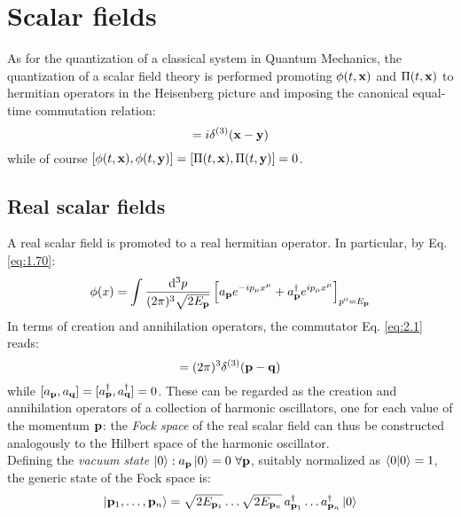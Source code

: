 
\section{Scalar fields}

As for the quantization of a classical system in Quantum Mechanics, the quantization of a scalar field theory is performed promoting $ \phi(t,\mathbf{x}) $ and $ \Pi(t,\mathbf{x}) $ to hermitian operators in the Heisenberg picture and imposing the canonical equal-time commutation relation:
\begin{equation}
  [\phi(t,\ve{x}) , \Pi(t,\ve{y})] = i \delta^{(3)}(\ve{x} - \ve{y})
  \label{eq:2.1}
\end{equation}
while of course $ [\phi(t,\mathbf{x}) , \phi(t,\mathbf{y})] = [\Pi(t,\mathbf{x}) , \Pi(t,\mathbf{y})] = 0 $.

\subsection{Real scalar fields}

A real scalar field is promoted to a real hermitian operator. In particular, by Eq. \ref{eq:1.70}:
\begin{equation}
  \phi(x) = \int \frac{\mathrm{d}^3p}{(2\pi)^3 \sqrt{2E_{\mathbf{p}}}} \left[ a_{\mathbf{p}} e^{-i p_\mu x^\mu} + a_{\mathbf{p}}^\dagger e^{i p_\mu x^\mu} \right]_{p^0 = E_{\mathbf{p}}}
  \label{eq:2.2}
\end{equation}
In terms of creation and annihilation operators, the commutator Eq. \ref{eq:2.1} reads:
\begin{equation}
  [a_\ve{p} , a_\ve{p}^\dagger] = (2\pi)^3 \delta^{(3)}(\ve{p} - \ve{q})
  \label{eq:2.3}
\end{equation}
while $ [a_{\mathbf{p}} , a_{\mathbf{q}}] = [a_{\mathbf{p}}^\dagger , a_{\mathbf{q}}^\dagger] = 0 $. These can be regarded as the creation and annihilation operators of a collection of harmonic oscillators, one for each value of the momentum $ \mathbf{p} $: the \textit{Fock space} of the real scalar field can thus be constructed analogously to the Hilbert space of the harmonic oscillator.\\
Defining the \textit{vacuum state} $ \ket{0} : a_{\mathbf{p}} \ket{0} = 0 \,\,\forall \mathbf{p} $, suitably normalized as $ \braket{0 | 0} = 1 $, the generic state of the Fock space is:
\begin{equation}
  \ket{\mathbf{p}_1 , \dots , \mathbf{p}_n} = \sqrt{2E_{\mathbf{p}_1}} \dots \sqrt{2E_{\mathbf{p}_n}}\, a_{\mathbf{p}_1}^\dagger \dots a_{\mathbf{p}_n}^\dagger \ket{0}
  \label{eq:2.4}
\end{equation}

